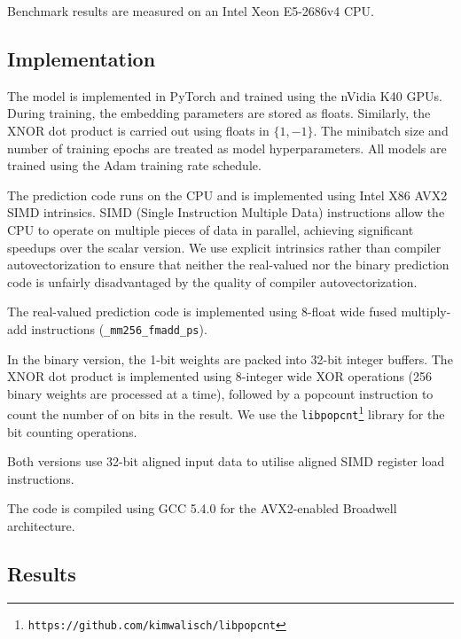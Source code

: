 \documentclass[sigconf]{acmart}
\begin{document}
Benchmark results are measured on an Intel Xeon E5-2686v4 CPU.

\subsection{Implementation}
The model is implemented in PyTorch and trained using the nVidia K40 GPUs. During training, the embedding parameters are stored as floats. Similarly, the XNOR dot product is carried out using floats in $\{1, -1\}$. The minibatch size and number of training epochs are treated as model hyperparameters. All models are trained using the Adam training rate schedule. 

The prediction code runs on the CPU and is implemented using Intel X86 AVX2 SIMD intrinsics. SIMD (Single Instruction Multiple Data) instructions allow the CPU to operate on multiple pieces of data in parallel, achieving significant speedups over the scalar version. We use explicit intrinsics rather than compiler autovectorization to ensure that neither the real-valued nor the binary prediction code is unfairly disadvantaged by the quality of compiler autovectorization. 

The real-valued prediction code is implemented using 8-float wide fused multiply-add instructions (\texttt{\_mm256\_fmadd\_ps}).

In the binary version, the 1-bit weights are packed into 32-bit integer buffers. The XNOR dot product is implemented using 8-integer wide XOR operations (256 binary weights are processed at a time), followed by a popcount instruction to count the number of on bits in the result. We use the \texttt{libpopcnt}\footnote{\texttt{https://github.com/kimwalisch/libpopcnt}} \citep{mula2016faster} library for the bit counting operations.

Both versions use 32-bit aligned input data to utilise aligned SIMD register load instructions. 

The code is compiled using GCC 5.4.0 for the AVX2-enabled Broadwell architecture.

\subsection{Results}





%
%
\end{document}
